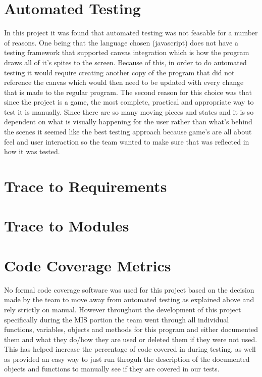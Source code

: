 \documentclass[12pt, titlepage]{article}
\begin{document}
\section{Automated Testing}
In this project it was found that automated testing was not feasable for a number of reasons. One being that the language chosen (javascript) does not have a testing framework that supported canvas integration which is how the program draws all of it's spites to the screen. Because of this, in order to do automated testing it would require creating another copy of the program that did not reference the canvas which would then need to be updated with every change that is made to the regular program. The second reason for this choice was that since the project is a game, the most complete, practical and appropriate way to test it is manually. Since there are so many moving pieces and states and it is so dependent on what is visually happening for the user rather than what's behind the scenes it seemed like the best testing approach because game's are all about feel and user interaction so the team wanted to make sure that was reflected in how it was tested.

\section{Trace to Requirements}
\section{Trace to Modules}
\section{Code Coverage Metrics}
No formal code coverage software was used for this project based on the decision made by the team to move away from automated testing as explained above and rely strictly on manual. However throughout the development of this project specifically during the MIS portion the team went through all individual functions, variables, objects and methods for this program and either documented them and what they do/how they are used or deleted them if they were not used. This has helped increase the percentage of code covered in during testing, as well as provided an easy way to just run throguh the description of the documented objects and functions to manually see if they are covered in our tests.





\end{document}
